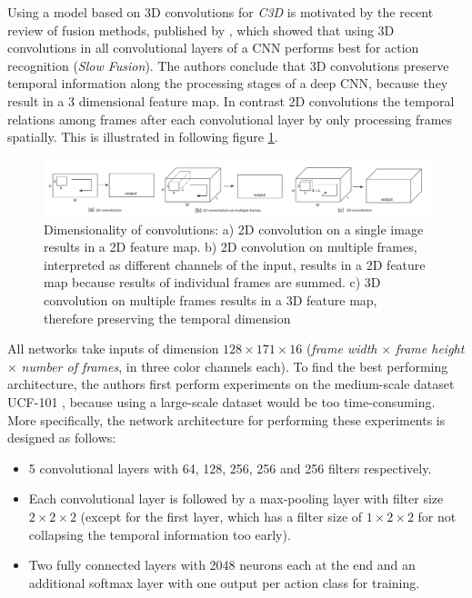 Using a model based on 3D convolutions for \textit{C3D} is motivated by the recent review of fusion methods, published by \textcite{karpathy_large-scale_2014}, which showed that using 3D convolutions in all convolutional layers of a CNN performs best for action recognition (\textit{Slow Fusion}).  
The authors conclude that 3D convolutions preserve temporal information along the processing stages of a deep CNN, because they result in a 3 dimensional feature map.
In contrast 2D convolutions the temporal relations among frames after each convolutional layer by only processing frames spatially.
This is illustrated in following figure \ref{fig:c3d_2dconv3dconv}.
\begin{figure}[H]
    \centering
    \includegraphics[width=\textwidth]{img_deep/c3d_2dconv3dconv}
\caption{Dimensionality of convolutions: a) 2D convolution on a single image results in a 2D feature map. b) 2D convolution on multiple frames, interpreted as different channels of the input, results in a 2D feature map because results of individual frames are summed. c) 3D convolution on multiple frames results in a 3D feature map, therefore preserving the temporal dimension \cite{karpathy_large-scale_2014}}
    \label{fig:c3d_2dconv3dconv}
\end{figure}

All networks take inputs of dimension $128\times171\times16$ (\textit{frame width} $\times$ \textit{frame height} $\times$ \textit{number of frames}, in three color channels each).
To find the best performing architecture, the authors first perform experiments on the medium-scale dataset UCF-101 \cite{soomro_ucf101:_2012}, because using a large-scale dataset would be too time-consuming.
More specifically, the network architecture for performing these experiments is designed as follows:
\begin{itemize}
    \item 5 convolutional layers with 64, 128, 256, 256 and 256 filters respectively.
    \item Each convolutional layer is followed by a max-pooling layer with filter size $2\times2\times2$ (except for the first layer, which has a filter size of $1\times2\times2$ for not collapsing the temporal information too early).
    \item Two fully connected layers with 2048 neurons each at the end and an additional softmax layer with one output per action class for training.
\end{itemize}

